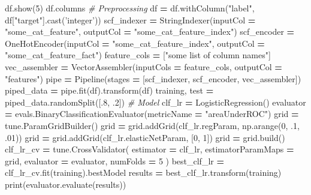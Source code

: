 \documentclass[]{book}
\newenvironment{Shaded}{\begin{snugshade}}{\end{snugshade}}
\newcommand{\BuiltInTok}[1]{#1}
\newcommand{\CommentTok}[1]{\textcolor[rgb]{0.56,0.35,0.01}{\textit{#1}}}
\newcommand{\DecValTok}[1]{\textcolor[rgb]{0.00,0.00,0.81}{#1}}
\newcommand{\FloatTok}[1]{\textcolor[rgb]{0.00,0.00,0.81}{#1}}
\newcommand{\NormalTok}[1]{#1}
\newcommand{\OperatorTok}[1]{\textcolor[rgb]{0.81,0.36,0.00}{\textbf{#1}}}
\newcommand{\StringTok}[1]{\textcolor[rgb]{0.31,0.60,0.02}{#1}}
\begin{document}
\begin{Shaded}
\begin{Highlighting}[]
\NormalTok{df.show(}\DecValTok{5}\NormalTok{)}
\NormalTok{df.columns}
\CommentTok{# Preprocessing}
\NormalTok{df }\OperatorTok{=}\NormalTok{ df.withColumn(}\StringTok{"label"}\NormalTok{, df[}\StringTok{"target"}\NormalTok{].cast(}\StringTok{'integer'}\NormalTok{))}
\NormalTok{scf_indexer }\OperatorTok{=}\NormalTok{ StringIndexer(inputCol }\OperatorTok{=} \StringTok{"some_cat_feature"}\NormalTok{, outputCol }\OperatorTok{=} \StringTok{"some_cat_feature_index"}\NormalTok{)}
\NormalTok{scf_encoder }\OperatorTok{=}\NormalTok{ OneHotEncoder(inputCol }\OperatorTok{=} \StringTok{"some_cat_feature_index"}\NormalTok{, outputCol }\OperatorTok{=} \StringTok{"some_cat_feature_fact"}\NormalTok{)}
\NormalTok{feature_cols }\OperatorTok{=}\NormalTok{ [}\StringTok{"some list of column names"}\NormalTok{]}
\NormalTok{vec_assembler }\OperatorTok{=}\NormalTok{ VectorAssembler(inputCols }\OperatorTok{=}\NormalTok{ feature_cols, }
\NormalTok{                                outputCol }\OperatorTok{=} \StringTok{"features"}\NormalTok{)}
\NormalTok{pipe }\OperatorTok{=}\NormalTok{ Pipeline(stages }\OperatorTok{=}\NormalTok{ [scf_indexer, scf_encoder, vec_assembler])}
\NormalTok{piped_data }\OperatorTok{=}\NormalTok{ pipe.fit(df).transform(df)}
\NormalTok{training, test }\OperatorTok{=}\NormalTok{ piped_data.randomSplit([.}\DecValTok{8}\NormalTok{, }\FloatTok{.2}\NormalTok{])}
\CommentTok{# Model}
\NormalTok{clf_lr }\OperatorTok{=}\NormalTok{ LogisticRegression()}
\NormalTok{evaluator }\OperatorTok{=}\NormalTok{ evals.BinaryClassificationEvaluator(metricName }\OperatorTok{=} \StringTok{"areaUnderROC"}\NormalTok{)}
\NormalTok{grid }\OperatorTok{=}\NormalTok{ tune.ParamGridBuilder()}
\NormalTok{grid }\OperatorTok{=}\NormalTok{ grid.addGrid(clf_lr.regParam, np.arange(}\DecValTok{0}\NormalTok{, }\FloatTok{.1}\NormalTok{, }\FloatTok{.01}\NormalTok{))}
\NormalTok{grid }\OperatorTok{=}\NormalTok{ grid.addGrid(clf_lr.elasticNetParam, [}\DecValTok{0}\NormalTok{, }\DecValTok{1}\NormalTok{])}
\NormalTok{grid }\OperatorTok{=}\NormalTok{ grid.build()}
\NormalTok{clf_lr_cv }\OperatorTok{=}\NormalTok{ tune.CrossValidator(}
\NormalTok{    estimator }\OperatorTok{=}\NormalTok{ clf_lr,}
\NormalTok{    estimatorParamMaps }\OperatorTok{=}\NormalTok{ grid,}
\NormalTok{    evaluator }\OperatorTok{=}\NormalTok{ evaluator,}
\NormalTok{    numFolds }\OperatorTok{=} \DecValTok{5}
\NormalTok{               )}
\NormalTok{best_clf_lr }\OperatorTok{=}\NormalTok{ clf_lr_cv.fit(training).bestModel}
\NormalTok{results }\OperatorTok{=}\NormalTok{ best_clf_lr.transform(training)}
\BuiltInTok{print}\NormalTok{(evaluator.evaluate(results))}

\end{Highlighting}
\end{Shaded}
\end{document}
